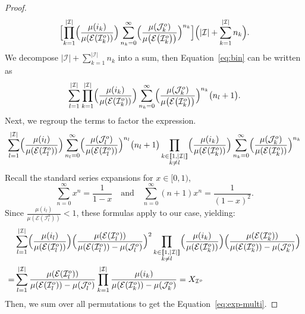 \documentclass[11pt]{article}
\begin{document}
\begin{proof}
	\begin{equation}\label{eq:bin}
		\Bigl[\prod_{k=1}^{|\mathcal{I}|}\Bigl(\frac{\mu({i_k})}{\mu({\mathcal{E}(\mathcal{I}_k^o)})}\Bigr) \sum_{n_k=0}^{\infty}\Bigl(\frac{\mu({\mathcal{J}_k^o})}{\mu\big(\mathcal{E}\bigl(\mathcal{I}_k^o\bigr)\big)}\Bigr)^{n_k}\Bigr]\Bigl(|\mathcal{I}|+\sum_{k=1}^{|\mathcal{I}|} n_k\Bigr).   
	\end{equation}
	We decompose $|\mathcal{I}|+\sum_{k=1}^{|\mathcal{I}|} n_k$ into a sum, then Equation~\eqref{eq:bin} can be written as 
	\begin{equation}
		\sum_{l=1}^{|\mathcal{I}|} \prod_{k=1}^{|\mathcal{I}|}\Bigl(\frac{\mu({i_k})}{\mu({\mathcal{E}(\mathcal{I}_k^o)})}\Bigr) \sum_{n_k=0}^{\infty}\Bigl(\frac{\mu({\mathcal{J}_k^o})}{\mu\big(\mathcal{E}\bigl(\mathcal{I}_k^o\bigr)\big)}\Bigr)^{n_k}\bigl(n_l+1\bigr).
	\end{equation}
	Next, we regroup the terms to factor the expression.
	\begin{equation}
		\sum_{l=1}^{|\mathcal{I}|}\Bigl(\frac{\mu({i_l})}{ \mu({\mathcal{E}(\mathcal{I}_l^o)})}\Bigr) \sum_{n_l=0}^{\infty}\Bigl(\frac{\mu({\mathcal{J}_l^o})}{ \mu({\mathcal{E}(\mathcal{I}_l^o)})}\Bigr)^{n_l}\bigl(n_l+1\bigr) \prod_{\substack{k \in[\![1,|\mathcal{I}|]\!]\\ k\neq l}}\Bigl(\frac{\mu({i_k})}{\mu({\mathcal{E}(\mathcal{I}_k^o)}) }\Bigr)\sum_{n_k=0}^{\infty}\Bigl(\frac{ \mu({\mathcal{J}_k^o})}{ \mu({\mathcal{E}(\mathcal{I}_k^o)} )}\Bigr)^{n_k}
	\end{equation}
	Recall the standard series expansions for $x\in[0,1)$, $$\sum_{n=0}^\infty x^n= \frac{1}{1-x}\quad\text{and}\quad\sum_{n=0}^{\infty}(n+1)x^n= \frac{1}{(1-x)^2}.$$ Since $\frac{\mu({i_l})}{ \mu({\mathcal{E}(\mathcal{I}_l^o)})}<1$, these formulas apply to our case, yielding:
	\begin{equation}
		\begin{aligned}& \sum_{l=1}^{|\mathcal{I}|}\Bigl(\frac{\mu({i_l})}{ \mu({\mathcal{E}(\mathcal{I}_l^o)})}\Bigr)\Bigl(\frac{ \mu({\mathcal{E}(\mathcal{I}_l^o)})}{ \mu({\mathcal{E}(\mathcal{I}_l^o)})- \mu({\mathcal{J}_l^o})}\Bigr)^2 \prod_{{\substack{k \in[\![1,|\mathcal{I}|]\!]\\ k\neq l}}}\Bigl(\frac{\mu({i_k})}{ \mu({\mathcal{E}(\mathcal{I}_k^o)})}\Bigr)\Bigl(\frac{ \mu({\mathcal{E}(\mathcal{I}_k^o)})}{\mu({\mathcal{E}(\mathcal{I}_k^o)})-\mu({\mathcal{J}_k^o})}\Bigr) \\
			= & \sum_{l=1}^{|\mathcal{I}|} \frac{\mu({\mathcal{E}(\mathcal{I}_l^o)})}{\mu({\mathcal{E}(\mathcal{I}_l^o)})-\mu({\mathcal{J}_l^o})} \prod_{k=1}^{|\mathcal{I}|} \frac{\mu({i_k})}{\mu({\mathcal{E}(\mathcal{I}_k^o)})-\mu({\mathcal{J}_k^o})}
			=X_{\mathcal{I}^o}
		\end{aligned}
	\end{equation}
	Then, we sum over all permutations to get the Equation~\eqref{eq:exp-multi}.
\end{proof}    
\end{document}
